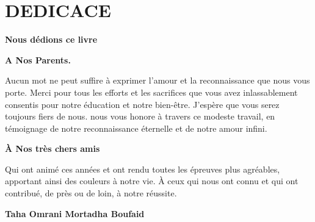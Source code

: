 \chapter*{DEDICACE}
\thispagestyle{MyStyle}
\begin{center}

 {\huge \textbf{Nous dédions ce livre}}

 \vspace{0.5cm}\textbf{A Nos Parents.}

Aucun mot ne peut suffire à exprimer l’amour et la reconnaissance que nous vous porte.
Merci pour tous les efforts et les sacrifices que vous avez inlassablement
consentis pour notre éducation et notre bien-être. J’espère que vous serez toujours fiers de nous. nous vous honore à travers ce modeste travail, en témoignage de notre reconnaissance éternelle et de notre amour infini.\par


\textbf{À Nos très chers amis}

Qui ont animé ces années et ont rendu toutes les épreuves plus agréables, apportant ainsi des couleurs à notre vie. À ceux qui nous ont connu et qui ont contribué, de près ou de loin, à notre réussite.

\begin{minipage}{0.7\textwidth}
\hfill\large\textbf{Taha Omrani  Mortadha Boufaid}
\end{minipage}
\end{center}

